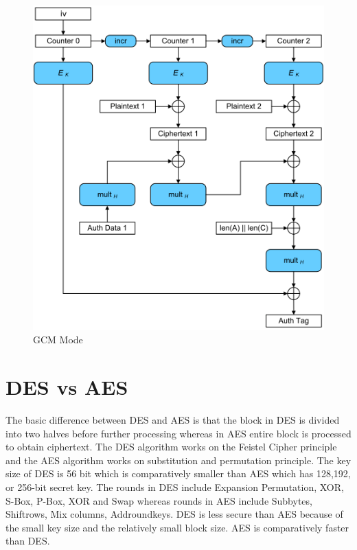 \begin{figure}
	\centering
	\includegraphics[width=0.7\linewidth]{Images/Chapter3/GCM_mode}
	\caption{GCM Mode}
	\label{fig:GCM_mode}
\end{figure}


\section{DES vs AES}

The basic difference between DES and AES is that the block in DES is divided into two halves before further processing whereas in AES entire block is processed to obtain ciphertext. The DES algorithm works on the Feistel Cipher principle and the AES algorithm works on substitution and permutation principle. The key size of DES is 56 bit which is comparatively smaller than AES which has 128,192, or 256-bit secret key. The rounds in DES include Expansion Permutation, XOR, S-Box, P-Box, XOR and Swap whereas rounds in AES include Subbytes, Shiftrows, Mix columns, Addroundkeys. DES is less secure than AES because of the small key size and the relatively small block size. AES is comparatively faster than DES.
